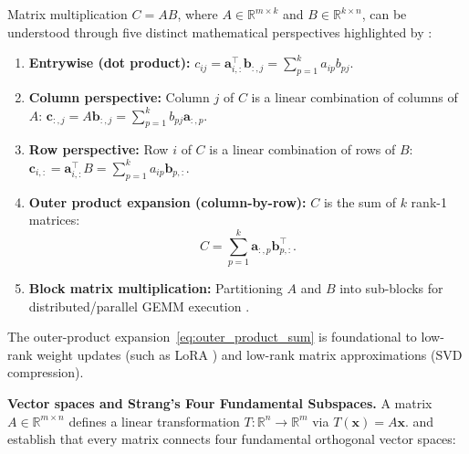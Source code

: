 \documentclass[11pt,a4paper]{article}
\begin{document}
	Matrix multiplication $C = AB$, where $A \in \mathbb{R}^{m \times k}$ and $B \in \mathbb{R}^{k \times n}$, can be understood through five distinct mathematical perspectives highlighted by \textcite[Chapter~1]{strang2012linear}:
	\begin{enumerate}[nosep]
		\item \textbf{Entrywise (dot product):} $c_{ij} = \mathbf{a}_{i,:}^\top \mathbf{b}_{:,j} = \sum_{p=1}^k a_{ip} b_{pj}$.
		\item \textbf{Column perspective:} Column $j$ of $C$ is a linear combination of columns of $A$: $\mathbf{c}_{:,j} = A \mathbf{b}_{:,j} = \sum_{p=1}^k b_{pj} \mathbf{a}_{:,p}$.
		\item \textbf{Row perspective:} Row $i$ of $C$ is a linear combination of rows of $B$: $\mathbf{c}_{i,:} = \mathbf{a}_{i,:}^\top B = \sum_{p=1}^k a_{ip} \mathbf{b}_{p,:}$.
		\item \textbf{Outer product expansion (column-by-row):} $C$ is the sum of $k$ rank-1 matrices:
		      \begin{equation}
			      C = \sum_{p=1}^{k} \mathbf{a}_{:,p} \mathbf{b}_{p,:}^{\!\top}.
			      \label{eq:outer_product_sum}
		      \end{equation}
		\item \textbf{Block matrix multiplication:} Partitioning $A$ and $B$ into sub-blocks for distributed/parallel GEMM execution \parencite{golub2013}.
	\end{enumerate}
	The outer-product expansion~\eqref{eq:outer_product_sum} is foundational to low-rank weight updates (such as LoRA \parencite{hu2021}) and low-rank matrix approximations (SVD compression).

	\begin{practicebox}

	\end{practicebox}

	\textbf{Vector spaces and Strang's Four Fundamental Subspaces.}
	A matrix $A \in \mathbb{R}^{m \times n}$ defines a linear transformation $T: \mathbb{R}^n \to \mathbb{R}^m$ via $T(\mathbf{x}) = A\mathbf{x}$. \textcite[Chapter~2]{strang2012linear} and \textcite[Chapter~1]{strang2019} establish that every matrix connects four fundamental orthogonal vector spaces:
\end{document}
